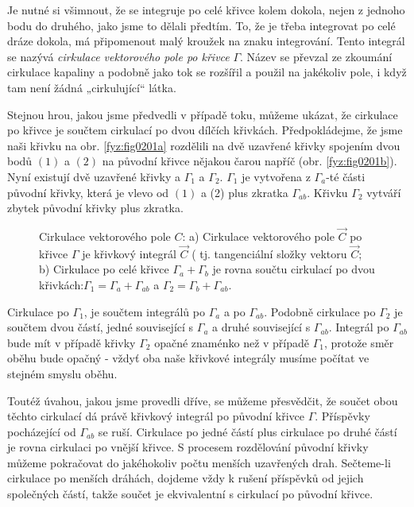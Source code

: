     Je nutné si všimnout, že se integruje po celé křivce kolem dokola, nejen z jednoho bodu do 
    druhého, jako jsme to dělali předtím. To, že je třeba integrovat po celé dráze dokola, má 
    připomenout malý kroužek na znaku integrování. Tento integrál se nazývá \emph{cirkulace 
    vektorového pole po křivce} \(\Gamma\). Název se převzal ze zkoumání cirkulace kapaliny a 
    podobně jako tok se rozšířil a použil na jakékoliv pole, i když tam není žádná „cirkulující“ 
    látka.
    
    Stejnou hrou, jakou jsme předvedli v případě toku, můžeme ukázat, že cirkulace po křivce je 
    součtem cirkulací po dvou dílčích křivkách. Předpokládejme, že jsme naši křivku na obr. 
    \ref{fyz:fig0201a} rozdělili na dvě uzavřené křivky spojením dvou bodů \((1)\) a \((2)\) na 
    původní křivce nějakou čarou napříč (obr. \ref{fyz:fig0201b}). Nyní existují dvě uzavřené 
    křivky  a \(\Gamma_1\) a \(\Gamma_2\). \(\Gamma_1\) je vytvořena z \(\Gamma_a\)-té části 
    původní křivky, která je vlevo od \((1)\) a (2) plus zkratka \(\Gamma_{ab}\). Křivku 
    \(\Gamma_2\) vytváří zbytek původní křivky plus zkratka.
    
    \begin{figure}[ht!]
      \centering
      \caption{Cirkulace vektorového pole \(C\): a) Cirkulace vektorového pole \(\vec{C}\) po 
               křivce \(\Gamma\) je křivkový integrál \(\vec{C}\) ( tj. tangenciální složky vektoru 
               \(\vec{C}\); b) Cirkulace po celé křivce \(\Gamma_a+\Gamma_b\) je rovna součtu 
               cirkulací po dvou křivkách:\(\Gamma_1=\Gamma_a+\Gamma_{ab}\) a \(\Gamma_2=\Gamma_b
               +\Gamma_{ab}\).}
      \label{fyz:fig0201}
    \end{figure} 
 
    Cirkulace po \(\Gamma_1\), je součtem integrálů po \(\Gamma_a\) a po \(\Gamma_{ab}\). Podobně 
    cirkulace po \(\Gamma_2\) je součtem dvou částí, jedné související s \(\Gamma_a\) a druhé 
    související s \(\Gamma_{ab}\). Integrál po \(\Gamma_{ab}\) bude mít v případě křivky 
    \(\Gamma_2\) opačné znaménko než v případě \(\Gamma_1\), protože směr oběhu bude opačný - vždyť 
    oba naše křivkové integrály musíme počítat ve stejném smyslu oběhu.
        
    Toutéž úvahou, jakou jsme provedli dříve, se můžeme přesvědčit, že součet obou těchto cirkulací
    dá právě křivkový integrál po původní křivce \(\Gamma\). Příspěvky pocházející od 
    \(\Gamma_{ab}\) se ruší. Cirkulace po jedné částí plus cirkulace po druhé částí je rovna 
    cirkulaci po vnější křivce. S procesem rozdělování původní křivky můžeme pokračovat do 
    jakéhokoliv počtu menších uzavřených drah. Sečteme-li cirkulace po menších dráhách, dojdeme 
    vždy k rušení příspěvků od jejich společných částí, takže součet je ekvivalentní s cirkulací po 
    původní křivce.       

